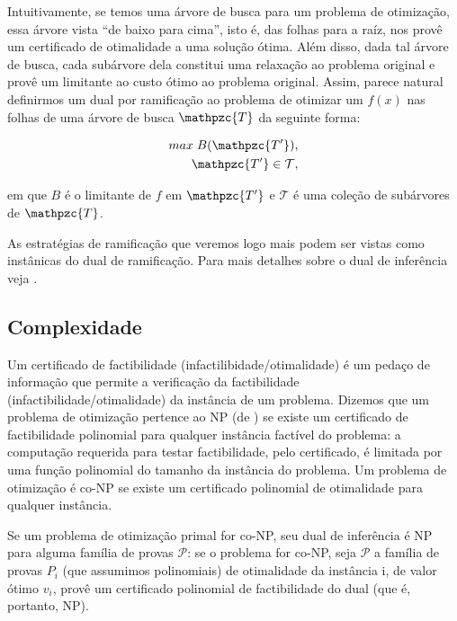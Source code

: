 \documentclass{article}
\begin{document}
Intuitivamente, se temos uma árvore de busca para um problema de otimização, essa árvore vista ``de
baixo para cima'', isto é, das folhas para a raíz, nos provê um certificado de otimalidade a uma
solução ótima. Além disso, dada tal árvore de busca, cada subárvore dela constitui uma relaxação ao
problema original e provê um limitante ao custo ótimo ao problema original.
Assim, parece natural definirmos um dual por ramificação ao problema de otimizar um $f(x)$ nas
folhas de uma árvore de busca $\mathpzc{T}$ da seguinte forma:

\begin{equation}
  \begin{split}
    max\; B(\mathpzc{T'}),\\
    \mathpzc{T'} \in \mathcal{T},
  \end{split}
\end{equation}

\noindent em que $B$ é o limitante de $f$ em $\mathpzc{T'}$ e $\mathcal{T}$ é uma coleção de
subárvores de $\mathpzc{T}$.

As estratégias de ramificação que veremos logo mais podem ser vistas como instânicas do dual de
ramificação. Para mais detalhes sobre o dual de inferência veja \cite{hooker}.


\subsection{Complexidade}

Um certificado de factibilidade (infactilibidade/otimalidade) é um pedaço de
informação que permite a verificação da factibilidade (infactibilidade/otimalidade) da instância de
um problema. Dizemos que um problema de otimização pertence ao NP (de ) se existe um certificado de factibilidade polinomial para qualquer instância factível
do problema: a computação requerida para testar factibilidade, pelo certificado, é limitada por uma
função polinomial do tamanho da instância do problema. Um problema de otimização é co-NP se existe
um certificado polinomial de otimalidade para qualquer instância.

Se um problema de otimização primal for co-NP, seu dual de inferência é NP para alguma família de
provas $\mathcal{P}$: se o problema for co-NP, seja $\mathcal{P}$ a família de provas $P_i$ (que
assumimos polinomiais) de otimalidade da instância i, de valor ótimo $v_i$, provê um certificado
polinomial de factibilidade do dual (que é, portanto, NP).
\end{document}
